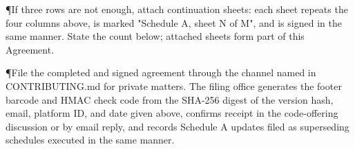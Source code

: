 \P{}{If three rows are not enough, attach continuation sheets: each sheet repeats the four columns above, is marked "Schedule A, sheet N of M", and is signed in the same manner. State the count below; attached sheets form part of this Agreement.}


\vskip 2mm

\P{}{File the completed and signed agreement through the channel named in CONTRIBUTING.md for private matters. The filing office generates the footer barcode and HMAC check code from the SHA-256 digest of the version hash, email, platform ID, and date given above, confirms receipt in the code-offering discussion or by email reply, and records Schedule A updates filed as superseding schedules executed in the same manner.}

\emitacroform

\bye
